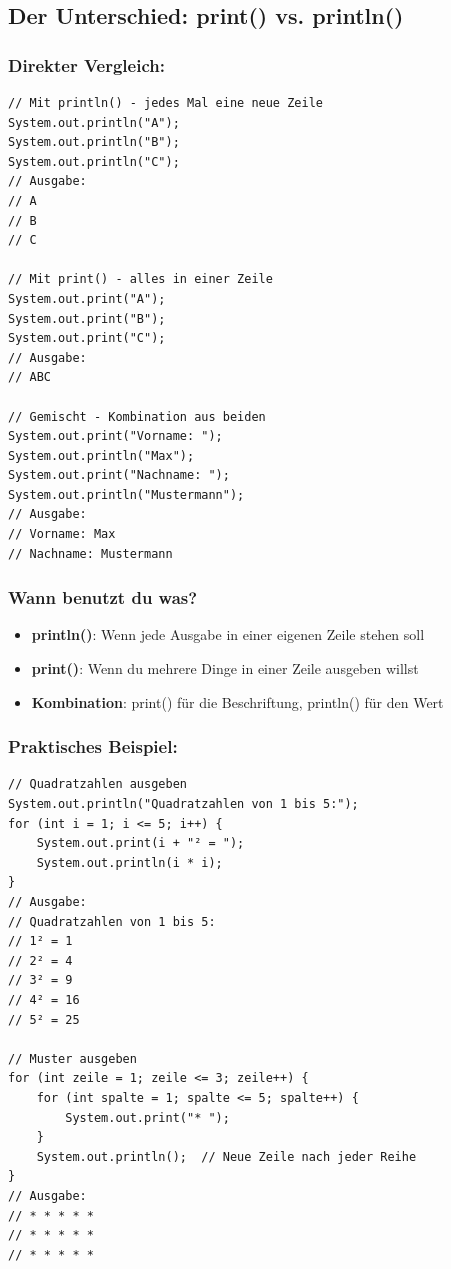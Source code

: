 \newpage


\subsection*{Der Unterschied: print() vs. println()}

\subsubsection*{Direkter Vergleich:}
\begin{lstlisting}
// Mit println() - jedes Mal eine neue Zeile
System.out.println("A");
System.out.println("B");
System.out.println("C");
// Ausgabe:
// A
// B
// C

// Mit print() - alles in einer Zeile
System.out.print("A");
System.out.print("B");
System.out.print("C");
// Ausgabe:
// ABC

// Gemischt - Kombination aus beiden
System.out.print("Vorname: ");
System.out.println("Max");
System.out.print("Nachname: ");
System.out.println("Mustermann");
// Ausgabe:
// Vorname: Max
// Nachname: Mustermann
\end{lstlisting}

\subsubsection*{Wann benutzt du was?}

\begin{itemize}
	\item \textbf{println()}: Wenn jede Ausgabe in einer eigenen Zeile stehen soll
	\item \textbf{print()}: Wenn du mehrere Dinge in einer Zeile ausgeben willst
	\item \textbf{Kombination}: print() für die Beschriftung, println() für den Wert
\end{itemize}

\subsubsection*{Praktisches Beispiel:}
\begin{lstlisting}
// Quadratzahlen ausgeben
System.out.println("Quadratzahlen von 1 bis 5:");
for (int i = 1; i <= 5; i++) {
    System.out.print(i + "² = ");
    System.out.println(i * i);
}
// Ausgabe:
// Quadratzahlen von 1 bis 5:
// 1² = 1
// 2² = 4
// 3² = 9
// 4² = 16
// 5² = 25

// Muster ausgeben
for (int zeile = 1; zeile <= 3; zeile++) {
    for (int spalte = 1; spalte <= 5; spalte++) {
        System.out.print("* ");
    }
    System.out.println();  // Neue Zeile nach jeder Reihe
}
// Ausgabe:
// * * * * *
// * * * * *
// * * * * *
\end{lstlisting}

